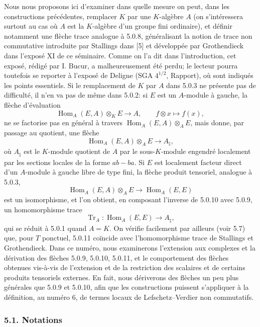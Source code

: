 \documentclass[11pt]{article}
\DeclareMathOperator{\Hom}{Hom}
\providecommand{\Tr}{\operatorname{Tr}}
\providecommand{\Tr}{\operatorname{Tr}}
\providecommand{\Tr}{\operatorname{Tr}}
\providecommand{\Hom}{\operatorname{Hom}}
\providecommand{\Tr}{\operatorname{Tr}}
\begin{document}
Nous nous proposons ici d'examiner dans quelle mesure on peut, dans les constructions précédentes, remplacer $K$ par une $K$-algèbre $A$ (on s'intéressera surtout au cas où $A$ est la $K$-algèbre d'un groupe fini ordinaire), et définir notamment une flèche trace analogue à 5.0.8, généralisant la notion de trace non commutative introduite par Stallings dans [5] et développée par Grothendieck dans l'exposé XI de ce séminaire. Comme on l'a dit dans l'introduction, cet exposé, rédigé par I. Bucur, a malheureusement été perdu; le lecteur pourra toutefois se reporter à l'exposé de Deligne (SGA $4^{1/2}$, Rapport), où sont indiqués les points essentiels. Si le remplacement de $K$ par $A$ dans 5.0.3 ne présente pas de difficulté, il n'en va pas de même dans 5.0.2: si $E$ est un $A$-module à gauche, la flèche d'évaluation
\[
\Hom_A(E,A)\otimes_KE\longrightarrow A,
\qquad f\otimes x\longmapsto f(x),
\]
ne se factorise pas en général à travers $\Hom_A(E,A)\otimes_AE$, mais donne, par passage au quotient, une flèche
\begin{equation}\tag{5.0.9}
\Hom_A(E,A)\otimes_AE\longrightarrow A_\natural,
\end{equation}
où $A_\natural$ est le $K$-module quotient de $A$ par le sous-$K$-module engendré localement par les sections locales de la forme $ab-ba$. Si $E$ est localement facteur direct d'un $A$-module à gauche libre de type fini, la flèche produit tensoriel, analogue à 5.0.3,
\begin{equation}\tag{5.0.10}
\Hom_A(E,A)\otimes_AE\longrightarrow\Hom_A(E,E)
\end{equation}
est un isomorphisme, et l'on obtient, en composant l'inverse de 5.0.10 avec 5.0.9, un homomorphisme trace
\begin{equation}\tag{5.0.11}
\Tr_A:\Hom_A(E,E)\longrightarrow A_\natural,
\end{equation}
qui se réduit à 5.0.1 quand $A=K$. On vérifie facilement par ailleurs (voir 5.7) que, pour $T$ ponctuel, 5.0.11 coïncide avec l'homomorphisme trace de Stallings et Grothendieck. Dans ce numéro, nous examinerons l'extension aux complexes et la dérivation des flèches 5.0.9, 5.0.10, 5.0.11, et le comportement des flèches obtenues vis-à-vis de l'extension et de la restriction des scalaires et de certains produits tensoriels externes. En fait, nous dériverons des flèches un peu plus générales que 5.0.9 et 5.0.10, afin que les constructions puissent s'appliquer à la définition, au numéro 6, de termes locaux de Lefschetz--Verdier non commutatifs.

\subsubsection*{5.1. Notations}
\end{document}
